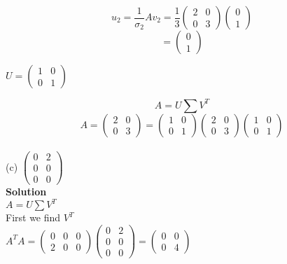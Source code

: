 \documentclass[12pt, oneside]{article}   	%
\begin{document}
\begin{enumerate}
	$$u_2= \frac{1}{\sigma_2}Av_2= \frac{1}{3}\left( \begin{array}{cc} 2&0 \\ 0& 3  \end{array} \right)\left( \begin{array}{c} 0 \\ 1  \end{array} \right)$$
	$$= \left( \begin{array}{c} 0 \\ 1  \end{array} \right)$$
	
	$
	U= \left( \begin{array}{cc} 1&0 \\ 0& 1  \end{array} \right)
	$
	
	$$A=U\sum V^T$$
	$$A=\left( \begin{array}{cc} 2 & 0 \\ 0 & 3  \end{array} \right)=\left( \begin{array}{cc} 1&0 \\ 0& 1  \end{array} \right) \left( \begin{array}{cc} 2 & 0 \\ 0 & 3  \end{array} \right) \left( \begin{array}{cc}1& 0 \\0& 1  \end{array} \right)$$\\
	
	(c) $\left( \begin{array}{cc} 0 & 2 \\ 0 & 0 \\ 0 & 0  \end{array} \right)$  \quad \\
	
	\textbf{Solution}\\
	
	$A=U\sum V^T$\\
	
	First we find $V^T$ \\
	
	$A^TA =\left( \begin{array}{ccc} 0 & 0&0 \\ 2 & 0&0  \end{array} \right) \left( \begin{array}{cc} 0 & 2 \\ 0 & 0\\ 0&0 \end{array} \right) =\left( \begin{array}{cc} 0 & 0 \\ 0 & 4  \end{array} \right)$\\
	

\end{enumerate}
\end{document}
